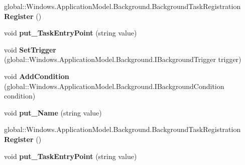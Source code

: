 \begin{DoxyCompactItemize}
global\+::\+Windows.\+Application\+Model.\+Background.\+Background\+Task\+Registration {\bfseries Register} ()
\item 
\mbox{\label{interface_windows_1_1_application_model_1_1_background_1_1_i_background_task_builder_a1d8e55116fd36c44eafe3e116a59e6d5}} 
void {\bfseries put\+\_\+\+Task\+Entry\+Point} (string value)
\item 
\mbox{\label{interface_windows_1_1_application_model_1_1_background_1_1_i_background_task_builder_a6389795cf781758bafc44a855ab10489}} 
void {\bfseries Set\+Trigger} (global\+::\+Windows.\+Application\+Model.\+Background.\+I\+Background\+Trigger trigger)
\item 
\mbox{\label{interface_windows_1_1_application_model_1_1_background_1_1_i_background_task_builder_aec7ccba5da7c8fc1b163a9871f3aba7c}} 
void {\bfseries Add\+Condition} (global\+::\+Windows.\+Application\+Model.\+Background.\+I\+Background\+Condition condition)
\item 
\mbox{\label{interface_windows_1_1_application_model_1_1_background_1_1_i_background_task_builder_a6afa1eee875932d0aededbdee329d0c9}} 
void {\bfseries put\+\_\+\+Name} (string value)
\item 
\mbox{\label{interface_windows_1_1_application_model_1_1_background_1_1_i_background_task_builder_a3ba4e67514edc80bd1d8315fdbef330f}} 
global\+::\+Windows.\+Application\+Model.\+Background.\+Background\+Task\+Registration {\bfseries Register} ()
\item 
\mbox{\label{interface_windows_1_1_application_model_1_1_background_1_1_i_background_task_builder_a1d8e55116fd36c44eafe3e116a59e6d5}} 
void {\bfseries put\+\_\+\+Task\+Entry\+Point} (string value)
\item 
\mbox{\label{interface_windows_1_1_application_model_1_1_background_1_1_i_background_task_builder_a6389795cf781758bafc44a855ab10489}} 

\end{DoxyCompactItemize}
